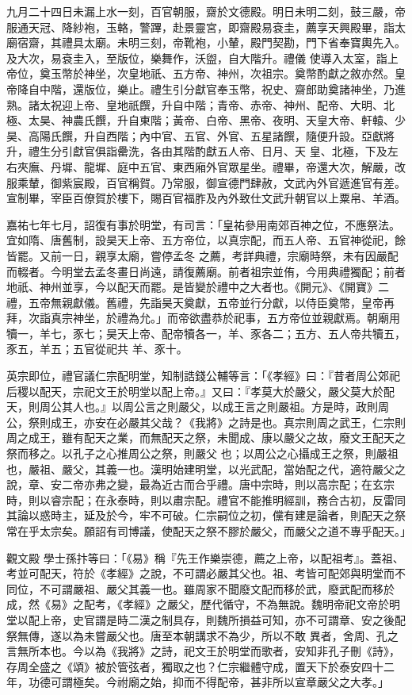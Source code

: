 \begin{pinyinscope}
 九月二十四日未漏上水一刻，百官朝服，齋於文德殿。明日未明二刻，鼓三嚴，帝服通天冠、降紗袍，玉輅，警蹕，赴景靈宮，即齋殿易袞圭，薦享天興殿畢，詣太廟宿齋，其禮具太廟。未明三刻，帝靴袍，小輦，殿門契勘，門下省奉寶輿先入。及大次，易袞圭入，至版位，樂舞作，沃盥，自大階升。禮儀
 使導入太室，詣上帝位，奠玉幣於神坐，次皇地祇、五方帝、神州，次祖宗。奠幣酌獻之敘亦然。皇帝降自中階，還版位，樂止。禮生引分獻官奉玉幣，祝史、齋郎助奠諸神坐，乃進熟。諸太祝迎上帝、皇地祇饌，升自中階；青帝、赤帝、神州、配帝、大明、北極、太昊、神農氏饌，升自東階；黃帝、白帝、黑帝、夜明、天皇大帝、軒轅、少昊、高陽氏饌，升自西階；內中官、五官、外官、五星諸饌，隨便升設。亞獻將升，禮生分引獻官俱詣罍洗，各由其階酌獻五人帝、日月、天
 皇、北極，下及左右夾廡、丹墀、龍墀、庭中五官、東西廂外官眾星坐。禮畢，帝還大次，解嚴，改服乘輦，御紫宸殿，百官稱賀。乃常服，御宣德門肆赦，文武內外官遞進官有差。宣制畢，宰臣百僚賀於樓下，賜百官福胙及內外致仕文武升朝官以上粟帛、羊酒。



 嘉祐七年七月，詔復有事於明堂，有司言：「皇祐參用南郊百神之位，不應祭法。宜如隋、唐舊制，設昊天上帝、五方帝位，以真宗配，而五人帝、五官神從祀，餘皆罷。又前一日，親享太廟，嘗停孟冬
 之薦，考詳典禮，宗廟時祭，未有因嚴配而輟者。今明堂去孟冬畫日尚遠，請復薦廟。前者祖宗並侑，今用典禮獨配；前者地祇、神州並享，今以配天而罷。是皆變於禮中之大者也。《開元》、《開寶》二禮，五帝無親獻儀。舊禮，先詣昊天奠獻，五帝並行分獻，以侍臣奠幣，皇帝再拜，次詣真宗神坐，於禮為允。」而帝欲盡恭於祀事，五方帝位並親獻焉。朝廟用犢一，羊七，豕七；昊天上帝、配帝犢各一，羊、豕各二；五方、五人帝共犢五，豕五，羊五；五官從祀共
 羊、豕十。



 英宗即位，禮官議仁宗配明堂，知制誥錢公輔等言：「《孝經》曰：『昔者周公郊祀后稷以配天，宗祀文王於明堂以配上帝。』又曰：『孝莫大於嚴父，嚴父莫大於配天，則周公其人也。』以周公言之則嚴父，以成王言之則嚴祖。方是時，政則周公，祭則成王，亦安在必嚴其父哉？《我將》之詩是也。真宗則周之武王，仁宗則周之成王，雖有配天之業，而無配天之祭，未聞成、康以嚴父之故，廢文王配天之祭而移之。以孔子之心推周公之祭，則嚴父
 也；以周公之心攝成王之祭，則嚴祖也，嚴祖、嚴父，其義一也。漢明始建明堂，以光武配，當始配之代，適符嚴父之說，章、安二帝亦弗之變，最為近古而合乎禮。唐中宗時，則以高宗配；在玄宗時，則以睿宗配；在永泰時，則以肅宗配。禮官不能推明經訓，務合古初，反雷同其論以惑時主，延及於今，牢不可破。仁宗嗣位之初，儻有建是論者，則配天之祭常在乎太宗矣。願詔有司博議，使配天之祭不膠於嚴父，而嚴父之道不專乎配天。」



 觀文殿
 學士孫抃等曰：「《易》稱『先王作樂崇德，薦之上帝，以配祖考』。蓋祖、考並可配天，符於《孝經》之說，不可謂必嚴其父也。祖、考皆可配郊與明堂而不同位，不可謂嚴祖、嚴父其義一也。雖周家不聞廢文配而移於武，廢武配而移於成，然《易》之配考，《孝經》之嚴父，歷代循守，不為無說。魏明帝祀文帝於明堂以配上帝，史官謂是時二漢之制具存，則魏所損益可知，亦不可謂章、安之後配祭無傳，遂以為未嘗嚴父也。唐至本朝講求不為少，所以不敢
 異者，舍周、孔之言無所本也。今以為《我將》之詩，祀文王於明堂而歌者，安知非孔子刪《詩》，存周全盛之《頌》被於管弦者，獨取之也？仁宗繼體守成，置天下於泰安四十二年，功德可謂極矣。今祔廟之始，抑而不得配帝，甚非所以宣章嚴父之大孝。」




\end{pinyinscope}
